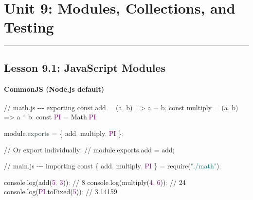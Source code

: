 \documentclass[
  justified,
  openright,
]{tufte-book}
\let\subsubsection\paragraph
\let\paragraph\paragraph
\newcommand{\AttributeTok}[1]{\textcolor{DarkSlateGray}{#1}}
\newcommand{\BuiltInTok}[1]{#1}
\newcommand{\CommentTok}[1]{\textcolor{MidGray}{#1}}
\newcommand{\ConstantTok}[1]{\textcolor{Purple}{#1}}
\newcommand{\DecValTok}[1]{\textcolor{Purple}{#1}}
\newcommand{\FunctionTok}[1]{\textcolor{BrandBlue}{#1}}
\newcommand{\KeywordTok}[1]{\textcolor{BrandBlue}{#1}}
\newcommand{\NormalTok}[1]{#1}
\newcommand{\OperatorTok}[1]{\textcolor{DarkGray}{#1}}
\newcommand{\PreprocessorTok}[1]{\textcolor{BrandAccent}{#1}}
\newcommand{\StringTok}[1]{\textcolor{Teal}{#1}}
\newenvironment{Shaded}{%
  \begin{snugshade}
}{%
  \end{snugshade}
}
\let\subsubsection\paragraph
\let\paragraph\paragraph
\begin{document}
\newpage

\section{Unit 9: Modules, Collections, and
Testing}\label{unit-9-modules-collections-and-testing}

\begin{center}\rule{0.5\linewidth}{0.5pt}\end{center}

\subsection{Lesson 9.1: JavaScript
Modules}\label{lesson-9.1-javascript-modules}

\subsubsection{CommonJS (Node.js
default)}\label{commonjs-node.js-default}

\begin{Shaded}
\begin{Highlighting}[]
\CommentTok{// math.js {-}{-}{-} exporting}
\KeywordTok{const}\NormalTok{ add }\OperatorTok{=}\NormalTok{ (a}\OperatorTok{,}\NormalTok{ b) }\KeywordTok{=\textgreater{}}\NormalTok{ a }\OperatorTok{+}\NormalTok{ b}\OperatorTok{;}
\KeywordTok{const}\NormalTok{ multiply }\OperatorTok{=}\NormalTok{ (a}\OperatorTok{,}\NormalTok{ b) }\KeywordTok{=\textgreater{}}\NormalTok{ a }\OperatorTok{*}\NormalTok{ b}\OperatorTok{;}
\KeywordTok{const} \ConstantTok{PI} \OperatorTok{=} \BuiltInTok{Math}\OperatorTok{.}\ConstantTok{PI}\OperatorTok{;}

\NormalTok{module}\OperatorTok{.}\AttributeTok{exports} \OperatorTok{=}\NormalTok{ \{ add}\OperatorTok{,}\NormalTok{ multiply}\OperatorTok{,} \ConstantTok{PI}\NormalTok{ \}}\OperatorTok{;}

\CommentTok{// Or export individually:}
\CommentTok{// module.exports.add = add;}
\end{Highlighting}
\end{Shaded}

\begin{Shaded}
\begin{Highlighting}[]
\CommentTok{// main.js {-}{-}{-} importing}
\KeywordTok{const}\NormalTok{ \{ add}\OperatorTok{,}\NormalTok{ multiply}\OperatorTok{,} \ConstantTok{PI}\NormalTok{ \} }\OperatorTok{=} \PreprocessorTok{require}\NormalTok{(}\StringTok{"./math"}\NormalTok{)}\OperatorTok{;}

\BuiltInTok{console}\OperatorTok{.}\FunctionTok{log}\NormalTok{(}\FunctionTok{add}\NormalTok{(}\DecValTok{5}\OperatorTok{,} \DecValTok{3}\NormalTok{))}\OperatorTok{;} \CommentTok{// 8}
\BuiltInTok{console}\OperatorTok{.}\FunctionTok{log}\NormalTok{(}\FunctionTok{multiply}\NormalTok{(}\DecValTok{4}\OperatorTok{,} \DecValTok{6}\NormalTok{))}\OperatorTok{;} \CommentTok{// 24}
\BuiltInTok{console}\OperatorTok{.}\FunctionTok{log}\NormalTok{(}\ConstantTok{PI}\OperatorTok{.}\FunctionTok{toFixed}\NormalTok{(}\DecValTok{5}\NormalTok{))}\OperatorTok{;} \CommentTok{// 3.14159}
\end{Highlighting}
\end{Shaded}
\end{document}
